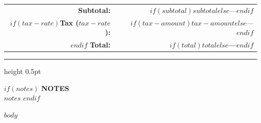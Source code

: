 \documentclass[11pt,letterpaper]{article}
\begin{document}
\vspace{0.3em}
\noindent\hfill
\begin{tabular}{r r}
  \textbf{Subtotal:} & $if(subtotal)$$subtotal$$else$—$endif$ \\
  $if(tax-rate)$\textbf{Tax ($tax-rate$):} & $if(tax-amount)$$tax-amount$$else$—$endif$ \\$endif$
  \midrule
  \rowcolor{totalrowbg}
  \textbf{\large Total:} & \textbf{\large $if(total)$$total$$else$—$endif$} \\
\end{tabular}

\vspace{1.5em}
{\color{rulecolor}\hrule height 0.5pt}

$if(notes)$
\vspace{0.8em}
\noindent\textbf{\small NOTES}\\[0.2em]
{\small $notes$}
$endif$

$body$
\end{document}
